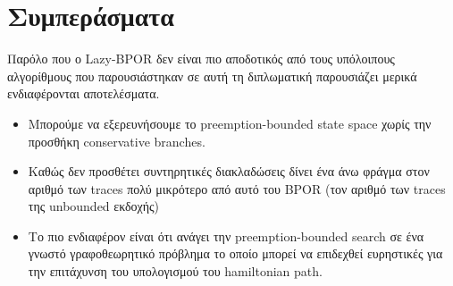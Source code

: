 \section{Συμπεράσματα}
Παρόλο που ο Lazy-BPOR δεν είναι πιο αποδοτικός από τους υπόλοιπους αλγορίθμους που παρουσιάστηκαν σε αυτή τη διπλωματική παρουσιάζει μερικά ενδιαφέρονται αποτελέσματα.

\begin{itemize}
    \item Μπορούμε να εξερευνήσουμε το preemption-bounded state space χωρίς την προσθήκη conservative branches.
    \item Καθώς δεν προσθέτει συντηρητικές διακλαδώσεις δίνει ένα άνω φράγμα στον αριθμό των traces πολύ μικρότερο από αυτό του BPOR (τον αριθμό των traces της unbounded εκδοχής)
    \item Το πιο ενδιαφέρον είναι ότι ανάγει την preemption-bounded search σε ένα γνωστό γραφοθεωρητικό πρόβλημα το οποίο μπορεί να επιδεχθεί ευρηστικές για την 
        επιτάχυνση του υπολογισμού του hamiltonian path.
\end{itemize}

